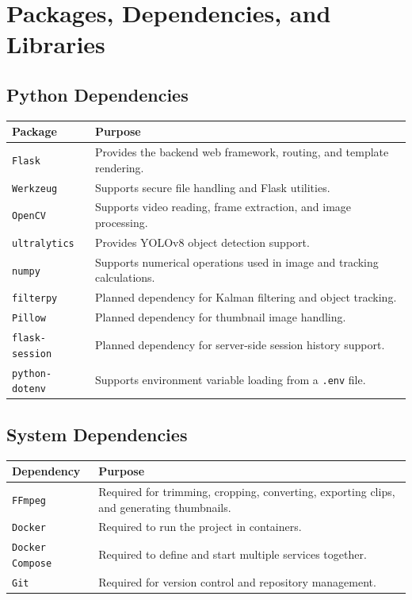 \documentclass[12pt]{article}
\begin{document}
\section{Packages, Dependencies, and Libraries}

\subsection{Python Dependencies}

\begin{longtable}{|p{1.6in}|p{4.4in}|}
\hline
\textbf{Package} & \textbf{Purpose} \\
\hline
\texttt{Flask} & Provides the backend web framework, routing, and template rendering. \\
\hline
\texttt{Werkzeug} & Supports secure file handling and Flask utilities. \\
\hline
\texttt{OpenCV} & Supports video reading, frame extraction, and image processing. \\
\hline
\texttt{ultralytics} & Provides YOLOv8 object detection support. \\
\hline
\texttt{numpy} & Supports numerical operations used in image and tracking calculations. \\
\hline
\texttt{filterpy} & Planned dependency for Kalman filtering and object tracking. \\
\hline
\texttt{Pillow} & Planned dependency for thumbnail image handling. \\
\hline
\texttt{flask-session} & Planned dependency for server-side session history support. \\
\hline
\texttt{python-dotenv} & Supports environment variable loading from a \texttt{.env} file. \\
\hline
\end{longtable}

\subsection{System Dependencies}

\begin{longtable}{|p{1.6in}|p{4.4in}|}
\hline
\textbf{Dependency} & \textbf{Purpose} \\
\hline
\texttt{FFmpeg} & Required for trimming, cropping, converting, exporting clips, and generating thumbnails. \\
\hline
\texttt{Docker} & Required to run the project in containers. \\
\hline
\texttt{Docker Compose} & Required to define and start multiple services together. \\
\hline
\texttt{Git} & Required for version control and repository management. \\
\hline
\end{longtable}
\end{document}
